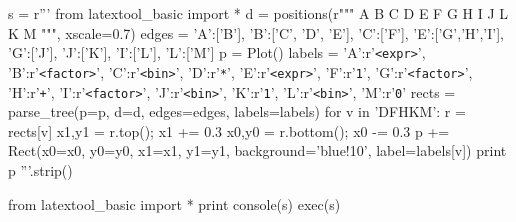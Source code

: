 \begin{python}
s = r'''
from latextool_basic import *
d = positions(r"""
   A
   B
C  D  E
F   G H I
    J   L
    K   M
""", xscale=0.7)
edges = {'A':['B'],          'B':['C', 'D', 'E'], 'C':['F'],
         'E':['G','H','I'],  'G':['J'],           'J':['K'],
         'I':['L'],          'L':['M']}
p = Plot()
labels = {'A':r'\texttt{<expr>}',   'B':r'\texttt{<factor>}',
          'C':r'\texttt{<bin>}',    'D':r'\texttt{*}',
          'E':r'\texttt{<expr>}',   'F':r'\texttt{1}',
          'G':r'\texttt{<factor>}', 'H':r'\texttt{+}',
          'I':r'\texttt{<factor>}', 'J':r'\texttt{<bin>}',
          'K':r'\texttt{1}',        'L':r'\texttt{<bin>}',
          'M':r'\texttt{0}'}
rects = parse_tree(p=p, d=d, edges=edges, labels=labels)
for v in 'DFHKM':
    r = rects[v]
    x1,y1 = r.top(); x1 += 0.3
    x0,y0 = r.bottom(); x0 -= 0.3
    p += Rect(x0=x0, y0=y0, x1=x1, y1=y1, background='blue!10',
              label=labels[v])
print p
'''.strip()

from latextool_basic import *
print console(s)
exec(s)
\end{python}
